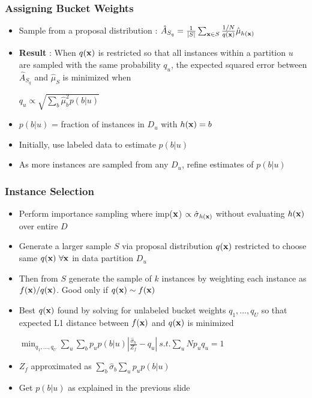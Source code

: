 \documentclass[11pt]{beamer}
\newcommand{\vek}[1]{{\bf {#1}}}
\newcommand{\vx}{{\vek{x}}}
\newcommand{\wt}{{p}}
\newcommand{\estSS}{{\mbox{$\hat{\mu}_S$}}}
\newcommand{\estSb}{{\mbox{$\hat{\mu}$}}}
\newcommand{\estVar}{{\mbox{$\hat{\sigma}$}}}
\newlength{\wideitemsep}
\let\olditem\item
\renewcommand{\item}{\setlength{\itemsep}{\wideitemsep}\olditem}
\begin{document}
\begin{frame}
\frametitle{Assigning Bucket Weights}
\begin{itemize}
\item Sample from a proposal distribution : $\hat{A}_{S_q} = \frac{1}{|S|}\sum\nolimits_{\vx\in S} \frac{1/N}{q(\vx)}\estSb_{h(\vx)}$
\item \textbf{Result} : When $q(\vx)$ is restricted so that all instances within a partition $u$ are sampled with the same probability $q_u$,
the expected squared error between $\hat{A}_{S_q}$ and $\estSS$ is minimized when 
\begin{center} $q_u \propto \sqrt{\sum_{b}\estSb^2_b\wt(b|u)}$ \end{center}
\item $\wt(b|u)$ = fraction of instances in $D_u$ with $h(\vx)=b$
\item Initially, use labeled data to estimate $\wt(b|u)$
\item As more instances are sampled from any $D_u$, refine estimates of $\wt(b|u)$
\end{itemize}
\end{frame}

\begin{frame}
\frametitle{Instance Selection}
\begin{itemize}
\item Perform importance sampling where imp($\vx$) $\propto \estVar_{h(\vx)}$ without evaluating $h(\vx)$ over entire $D$
\item Generate a larger sample $S$ via proposal distribution $q(\vx)$ restricted to choose same $q(\vx) ~\forall \vx$ in data
partition $D_u$ 
\item Then from $S$ generate the sample of $k$ instances by weighting each instance as $f(\vx)/q(\vx)$. Good only if $q(\vx) \sim f(\vx)$
\item Best $q(\vx)$ found by solving for unlabeled bucket weights $q_1,\ldots,q_U$
so that expected L1 distance between $f(\vx)$ and $q(\vx)$ is minimized
\begin{center}
$\min_{q_1,\ldots,q_U} \sum_u\sum_b \wt_u\wt(b|u) \left|\frac{\estVar_b}{Z_f} - q_u\right| ~s.t. \sum_u N\wt_uq_u=1$
\end{center}
\item $Z_f$ approximated as $\sum\nolimits_b\estVar_b\sum\nolimits_u\wt_u\wt(b|u)$
\item Get $\wt(b|u)$ as explained in the previous slide
\end{itemize}
\end{frame}
\end{document}
